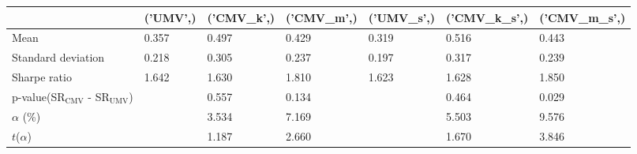 \begin{tabular}{lllllll}
\toprule
 & ('UMV',) & ('CMV_k',) & ('CMV_m',) & ('UMV_s',) & ('CMV_k_s',) & ('CMV_m_s',) \\
\midrule
Mean & 0.357 & 0.497 & 0.429 & 0.319 & 0.516 & 0.443 \\
Standard deviation & 0.218 & 0.305 & 0.237 & 0.197 & 0.317 & 0.239 \\
Sharpe ratio & 1.642 & 1.630 & 1.810 & 1.623 & 1.628 & 1.850 \\
p-value(SR$_{\text{CMV}}$ - SR$_{\text{UMV}}$) &  & 0.557 & 0.134 &  & 0.464 & 0.029 \\
$\alpha$ (\%) &  & 3.534 & 7.169 &  & 5.503 & 9.576 \\
$t$($\alpha$) &  & 1.187 & 2.660 &  & 1.670 & 3.846 \\
\bottomrule
\end{tabular}
